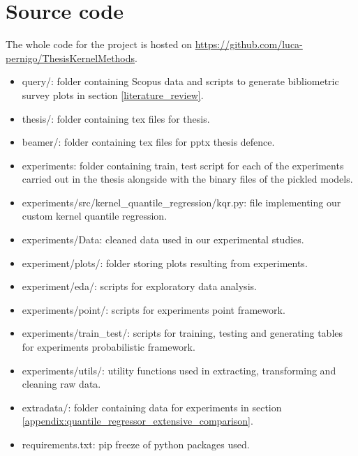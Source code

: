 \section{Source code}\label{src_code}
The whole code for the project is hosted on
\url{https://github.com/luca-pernigo/ThesisKernelMethods}\label{github_repo}.
\\
\begin{itemize}
    \item query/: folder containing Scopus data and scripts to generate bibliometric survey plots in section \ref{literature_review}.
    \item thesis/: folder containing tex files for thesis.
    \item beamer/: folder containing tex files for pptx thesis defence.
    \item experiments: folder containing train, test script for each of the experiments carried out in the thesis alongside with the binary files of the pickled models.
    \item experiments/src/kernel\_quantile\_regression/kqr.py: file implementing our custom kernel quantile regression.
    \item experiments/Data: cleaned data used in our experimental studies.
    \item experiment/plots/: folder storing plots resulting from experiments.
    \item experiment/eda/: scripts for exploratory data analysis.
    \item experiments/point/: scripts for experiments point framework.
    \item experiments/train\_test/: scripts for training, testing and generating tables for experiments probabilistic framework.
    \item experiments/utils/: utility functions used in extracting, transforming and cleaning raw data.
    \item extradata/: folder containing data for experiments in section \ref{appendix:quantile_regressor_extensive_comparison}.
    \item requirements.txt: pip freeze of python packages used.
\end{itemize}
